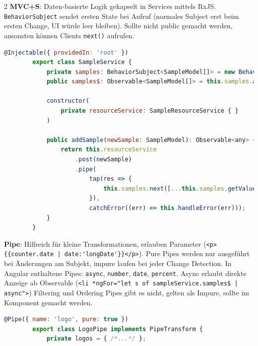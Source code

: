 \documentclass[10pt,landscape]{article}
\begin{document}
\begin{multicols}{2}
        \textbf{MVC+S}: Daten-basierte Logik gekapselt in Services mittels RxJS.
        \lstinline{BehaviorSubject} sendet ersten State bei Aufruf (normales Subject erst beim ersten Change, UI würde leer bleiben).
        Sollte nicht public gemacht werden, ansonsten können Clients \lstinline{next()} aufrufen.

        \begin{lstlisting}[language=JavaScript]
        @Injectable({ providedIn: 'root' })
        export class SampleService {
            private samples: BehaviorSubject<SampleModel[]> = new BehaviorSubject([]); // Event bus which is used to store the last state and to notify subscribers about updates.
            public samples$: Observable<SampleModel[]> = this.samples.asObservable(); // Convert event bus into an observable, which can be provided to the UI or other services.

            constructor(
                private resourceService: SampleResourceService { }
            )

            public addSample(newSample: SampleModel): Observable<any> {
                return this.resourceService
                    .post(newSample)
                    .pipe(
                        tap(res => {
                            this.samples.next([...this.samples.getValue(), newSample]); //  Store the retrieved data into the BehaviorSubject and emit the data changed event. Create a new array, otherwise the pipe cannot track the change.
                        }),
                        catchError((err) => this.handleError(err)));
            }
        }
        \end{lstlisting}

        \textbf{Pipe}: Hilfreich für kleine Transformationen, erlauben Parameter (\lstinline!<p>{{counter.date | date:'longDate'}}</p>!). Pure Pipes werden nur ausgeführt bei Änderungen am Subjekt, impure laufen bei jeder Change Detection.
        In Angular enthaltene Pipes: \lstinline{async}, \lstinline{number}, \lstinline{date}, \lstinline{percent}.
        Async erlaubt direkte Anzeige ab Observable (\lstinline!<li *ngFor="let s of sampleService.samples$ | async">!)
        Filtering und Ordering Pipes gibt es nicht, gelten als Impure, sollte im Komponent gemacht werden.

        \begin{lstlisting}[language=JavaScript]
        @Pipe({ name: 'logo', pure: true })
        export class LogoPipe implements PipeTransform {
            private logos = { /*...*/ };


\end{lstlisting}
\end{multicols}
\end{document}
